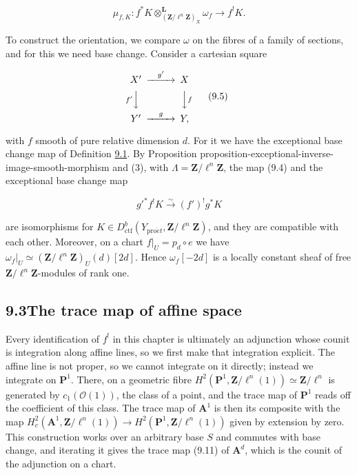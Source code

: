 \documentclass[11pt]{article}
\begin{document}
\[
\mu_{f,K}:f^{*}K\otimes^{\mathbf L}_{(\mathbf Z/\ell^n\mathbf Z)_{X}}\omega_{f}
\longrightarrow f^{!}K.
\tag{9.4}
\]

To construct the orientation, we compare \(\omega\) on the fibres of a family of sections, and for this we need base change. Consider a cartesian square

\[
\begin{CD}
X' @>{g'}>> X\\
@V{f'}VV @VV{f}V\\
Y' @>{g}>> Y,
\end{CD}
\tag{9.5}
\]

with \(f\) smooth of pure relative dimension \(d\). For it we have the exceptional base change map of Definition \hyperref[bp5]{9.1}. By Proposition proposition-exceptional-inverse-image-smooth-morphism and (3), with \(\Lambda=\mathbf Z/\ell^n\mathbf Z\), the map (9.4) and the exceptional base change map

\[
g'^{*}f^{!}K\xrightarrow{\sim}(f')^{!}g^{*}K
\tag{9.6}
\]

are isomorphisms for \(K\in D^b_{\mathrm{ctf}}(Y_{\mathrm{pro}\acute{e}t},\mathbf Z/\ell^n\mathbf Z)\), and they are compatible with each other. Moreover, on a chart \(f|_U=p_d\circ e\) we have \(\omega_f|_U\simeq(\mathbf Z/\ell^n\mathbf Z)_U(d)[2d]\). Hence \(\omega_f[-2d]\) is a locally constant sheaf of free \(\mathbf Z/\ell^n\mathbf Z\)-modules of rank one.


\subsection*{\texorpdfstring{9.3\quad The trace map of affine space}{9.3 The trace map of affine space}}
\label{bp15}%
\label{bp16}%
Every identification of \(f^!\) in this chapter is ultimately an adjunction whose counit is integration along affine lines, so we first make that integration explicit. The affine line is not proper, so we cannot integrate on it directly; instead we integrate on \(\mathbf P^1\). There, on a geometric fibre \(H^2(\mathbf P^1,\mathbf Z/\ell^n(1))\simeq\mathbf Z/\ell^n\) is generated by \(c_1(\mathcal O(1))\), the class of a point, and the trace map of \(\mathbf P^1\) reads off the coefficient of this class. The trace map of \(\mathbf A^1\) is then its composite with the map \(H^2_c(\mathbf A^1,\mathbf Z/\ell^n(1))\to H^2(\mathbf P^1,\mathbf Z/\ell^n(1))\) given by extension by zero. This construction works over an arbitrary base \(S\) and commutes with base change, and iterating it gives the trace map (9.11) of \(\mathbf A^d\), which is the counit of the adjunction on a chart.
\end{document}
